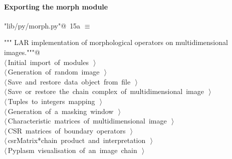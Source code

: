 \documentclass[11pt,oneside]{article}	%
\begin{document}
\paragraph{Exporting the morph module}
\begin{flushleft} \small
\begin{minipage}{\linewidth} \label{scrap26}
\protect{}\verb@"lib/py/morph.py"@\nobreak\ {\footnotesize 15a }$\equiv$
\vspace{-1ex}
\begin{list}{}{} \item
\mbox{}\verb@""" LAR implementation of morphological operators on multidimensional images."""@\\
\mbox{}\verb@@\hbox{$\langle\,$Initial import of modules\nobreak\ {\footnotesize {}}$\,\rangle$}\verb@@\\
\mbox{}\verb@@\hbox{$\langle\,$Generation of random image\nobreak\ {\footnotesize {}}$\,\rangle$}\verb@@\\
\mbox{}\verb@@\hbox{$\langle\,$Save and restore data object from file\nobreak\ {\footnotesize {}}$\,\rangle$}\verb@@\\
\mbox{}\verb@@\hbox{$\langle\,$Save or restore the chain complex of multidimensional image\nobreak\ {\footnotesize {}}$\,\rangle$}\verb@@\\
\mbox{}\verb@@\hbox{$\langle\,$Tuples to integers mapping\nobreak\ {\footnotesize {}}$\,\rangle$}\verb@@\\
\mbox{}\verb@@\hbox{$\langle\,$Generation of a masking window\nobreak\ {\footnotesize {}}$\,\rangle$}\verb@@\\
\mbox{}\verb@@\hbox{$\langle\,$Characteristic matrices of multidimensional image\nobreak\ {\footnotesize {}}$\,\rangle$}\verb@@\\
\mbox{}\verb@@\hbox{$\langle\,$CSR matrices of boundary operators\nobreak\ {\footnotesize {}}$\,\rangle$}\verb@@\\
\mbox{}\verb@@\hbox{$\langle\,$csrMatrix*chain product and interpretation\nobreak\ {\footnotesize {}}$\,\rangle$}\verb@@\\
\mbox{}\verb@@\hbox{$\langle\,$Pyplasm visualisation of an image chain\nobreak\ {\footnotesize {}}$\,\rangle$}\verb@@\\

\end{list}
\end{minipage}
\end{flushleft}
\end{document}
